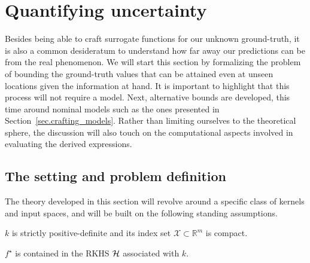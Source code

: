 
\section{Quantifying uncertainty}
\label{sec.quant_uncert}

Besides being able to craft surrogate functions for our unknown ground-truth, it is also a common desideratum to understand how far away our predictions can be from the real phenomenon. We will start this section by formalizing the problem of bounding the ground-truth values that can be attained even at unseen locations given the information at hand. It is important to highlight that this process will not require a model. Next, alternative bounds are developed, this time around nominal models such as the ones presented in Section~\ref{sec.crafting_models}. Rather than limiting ourselves to the theoretical sphere, the discussion will also touch on the computational aspects involved in evaluating the derived expressions.

\subsection{The setting and problem definition}

The theory developed in this section will revolve around a specific class of kernels and input spaces, and will be built on the following standing assumptions.

\begin{assumption}
	\label{as:kernel_spd_compact_X}
	 $k$ is strictly positive-definite and its index set $\mathcal{X} \subset \mathbb{R}^m$ is compact.
\end{assumption}

\begin{assumption}
	\label{as:rkhs_contains_gt}
	$f^\star$ is contained in the RKHS $\mathcal{H}$ associated with $k$.
\end{assumption}


